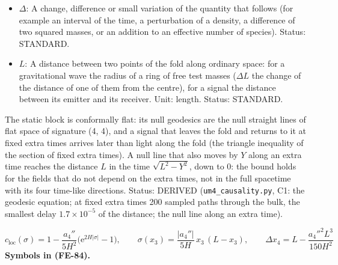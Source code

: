 \documentclass[
  10pt,
]{article}
\begin{document}
\begin{itemize}
  length. Status: AUTHOR.
\item
  \(\Delta\): A change, difference or small variation of the quantity
  that follows (for example an interval of the time, a perturbation of a
  density, a difference of two squared masses, or an addition to an
  effective number of species). Status: STANDARD.
\item
  \(L\): A distance between two points of the fold along ordinary space:
  for a gravitational wave the radius of a ring of free test masses
  (\(\Delta L\) the change of the distance of one of them from the
  centre), for a signal the distance between its emitter and its
  receiver. Unit: length. Status: STANDARD.
\end{itemize}

The static block is conformally flat: its null geodesics are the null
straight lines of flat space of signature (4, 4), and a signal that
leaves the fold and returns to it at fixed extra times arrives later
than light along the fold (the triangle inequality of the section of
fixed extra times). A null line that also moves by \(Y\) along an extra
time reaches the distance \(L\) in the time \(\sqrt{L^2 - Y^2}\), down
to 0: the bound holds for the fields that do not depend on the extra
times, not in the full spacetime with its four time-like directions.
Status: DERIVED (\texttt{um4\_causality.py}, C1: the geodesic equation;
at fixed extra times 200 sampled paths through the bulk, the smallest
delay \(1.7\times10^{-5}\) of the distance; the null line along an extra
time).

\[
c_{\mathrm{loc}}(\sigma) = 1 - \frac{a_4''}{5H^2}\big(\mathrm{e}^{2H\lvert\sigma\rvert} - 1\big),\qquad
\sigma(x_3) = \frac{\lvert a_4''\rvert}{5H}\,x_3\,(L - x_3),\qquad
\Delta x_4 = L - \frac{a_4''^2L^3}{150H^2} \tag{FE-84}
\] \textbf{Symbols in (FE-84).}
\end{document}
